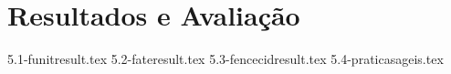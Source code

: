 \chapter{Resultados e Avaliação}\label{cap_resultados}

{5.1-funitresult.tex}
{5.2-fateresult.tex}
{5.3-fencecidresult.tex}
{5.4-praticasageis.tex}